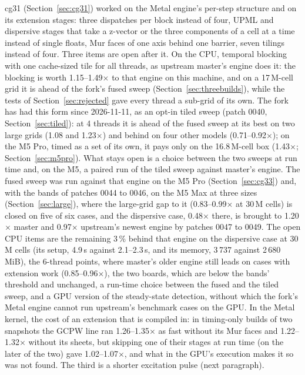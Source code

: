 cg31 (Section~\ref{sec:cg31}) worked on the Metal engine's per-step structure and on its extension stages: three
dispatches per block instead of four, UPML and dispersive stages that take a z-vector or the three components of a
cell at a time instead of single floats, Mur faces of one axis behind one barrier, seven tilings instead of four.
Three items are open after it. On the CPU, temporal blocking with one cache-sized tile for all threads, as upstream
master's  engine does it: the blocking is worth 1.15--1.49$\times$ to that engine on this machine, and on a
17\,M-cell grid it is ahead of the fork's fused sweep (Section~\ref{sec:threebuilds}), while the tests of
Section~\ref{sec:rejected} gave every thread a sub-grid of its own. The fork has had this form since 2026-11-11,
as an opt-in tiled sweep (patch 0040, Section~\ref{sec:tiled}): at 4 threads it is ahead of the fused sweep at its
best on two large grids (1.08 and 1.23$\times$) and behind on four other models (0.71--0.92$\times$); on the M5 Pro,
timed as a set of its own, it pays only on the 16.8\,M-cell box (1.43$\times$; Section~\ref{sec:m5pro}). What stays
open is a choice between the two sweeps at run time and, on the M5, a paired run of the tiled sweep against master's
 engine. The fused sweep was run against that engine on the M5 Pro (Section~\ref{sec:cg33}) and, with the bands of patches
0044 to 0046, on the M5 Max at three sizes (Section~\ref{sec:large}), where the large-grid gap to it (0.83--0.99$\times$ at
30\,M cells) is closed on five of six cases, and the dispersive case, 0.48$\times$ there, is brought to 1.20$\times$ master and 0.97$\times$
upstream's newest engine by patches 0047 to 0049. The open CPU items are the remaining 3\,\% behind that engine on the
dispersive case at 30\,M cells (its setup, 4.9\,s against 2.1--2.3\,s, and its memory, 3\,737 against 2\,680\,MiB), the 6-thread
points, where master's older engine still leads on cases with extension work (0.85--0.96$\times$), the two boards, which are below the
bands' threshold and unchanged, a run-time choice between the fused and the tiled sweep, and a GPU version of the steady-state
detection, without which the fork's Metal engine cannot run upstream's benchmark cases on the GPU. In the Metal kernel, the cost of an extension
that is compiled in: in timing-only builds of two snapshots the GCPW line ran 1.26--1.35$\times$ as fast without its
Mur faces and 1.22--1.32$\times$ without its sheets, but skipping one of their stages at run time (on the later of the
two) gave 1.02--1.07$\times$, and what in the GPU's execution makes it so was not found. The third is a shorter excitation pulse (next paragraph).

